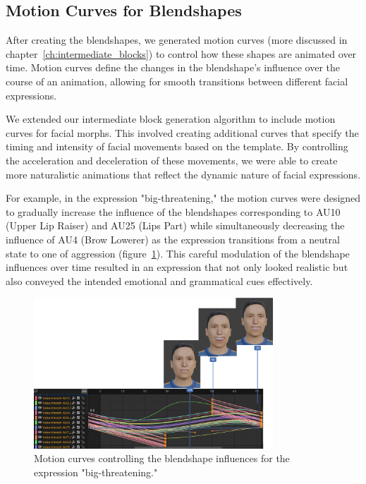 \documentclass[../../main]{subfiles}
\begin{document}
\subsection{Motion Curves for Blendshapes}
\label{ch:facial_expressions:motion_curves_for_blendshapes}

After creating the blendshapes, we generated motion curves (more discussed in chapter~\ref{ch:intermediate_blocks}) to control how these shapes are animated over time. Motion curves define the changes in the blendshape's influence over the course of an animation, allowing for smooth transitions between different facial expressions.

We extended our intermediate block generation algorithm to include motion curves for facial morphs. This involved creating additional curves that specify the timing and intensity of facial movements based on the template. By controlling the acceleration and deceleration of these movements, we were able to create more naturalistic animations that reflect the dynamic nature of facial expressions.

For example, in the expression "big-threatening," the motion curves were designed to gradually increase the influence of the blendshapes corresponding to AU10 (Upper Lip Raiser) and AU25 (Lips Part) while simultaneously decreasing the influence of AU4 (Brow Lowerer) as the expression transitions from a neutral state to one of aggression (figure~\ref{ch:facial_expressions:fig:motion_curve_example}). This careful modulation of the blendshape influences over time resulted in an expression that not only looked realistic but also conveyed the intended emotional and grammatical cues effectively.

\begin{figure}
    \centering
    \includegraphics[width=0.8\textwidth]{chapters/facial_expressions/images/motion_curve_example.png}
    \caption{Motion curves controlling the blendshape influences for the expression "big-threatening."}
    \label{ch:facial_expressions:fig:motion_curve_example}
\end{figure}
\end{document}
